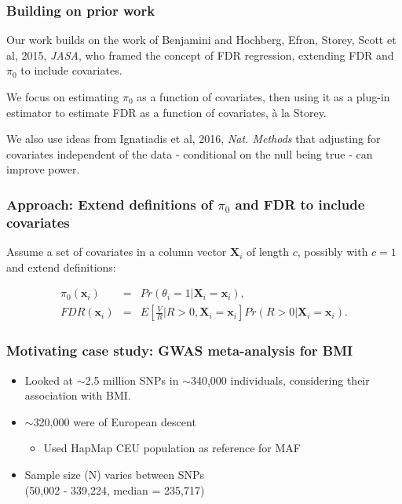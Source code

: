 \documentclass{beamer}
\newcommand{\bX}{\mathbf{X}}
\newcommand{\bx}{\mathbf{x}}
\begin{document}

\begin{frame}
\frametitle{Building on prior work}

Our work builds on the work of Benjamini and Hochberg, Efron, Storey, Scott et al, 2015, \textit{JASA},
who framed the concept of {\color{red}FDR regression}, extending FDR and $\pi_0$ to include covariates.\\ \vspace{0.5cm}

We focus on estimating $\pi_0$ as a function of covariates, then using it as a plug-in estimator to estimate FDR as a function of
covariates, \`{a} la Storey.\\ \vspace{0.5cm}

We also use ideas from Ignatiadis et al, 2016, \textit{Nat. Methods} that adjusting for covariates independent of the data - conditional on 
the null being true - can improve power.

\end{frame}


\begin{frame}
\frametitle{Approach: Extend definitions of $\pi_0$ and FDR to include covariates}

Assume a set of covariates in a column vector $\bX_i$ of length $c$, possibly with $c=1$ and extend definitions:


\begin{eqnarray*}
\pi_0(\bx_i) &=& Pr(\theta_i = 1|\bX_i=\bx_i),\\
FDR(\bx_i) &=& E \left [  \frac{V}{R} \bigg| R > 0, \bX_i=\bx_i \right ] Pr(R > 0|\bX_i=\bx_i).
\end{eqnarray*}


\end{frame}


\begin{frame}
\frametitle{Motivating case study: GWAS meta-analysis for BMI}

\begin{itemize}
\item Looked at $\sim$2.5 million SNPs in $\sim$340,000 individuals, considering their association with BMI.
\vspace{0.5cm}
\item $\sim$320,000 were of European descent
\begin{itemize}
\item Used HapMap CEU population as reference for MAF
\end{itemize}
\vspace{0.5cm}
\item Sample size (N) varies between SNPs \\
(50,002 - 339,224, median = 235,717)
\end{itemize}

\end{frame}
\end{document}
